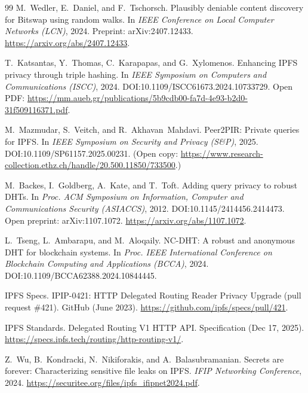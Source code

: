 \documentclass[11pt]{article}
\begin{document}
\begin{thebibliography}{99}
M.~Wedler, E.~Daniel, and F.~Tschorsch.
\newblock Plausibly deniable content discovery for Bitswap using random walks.
\newblock In \emph{IEEE Conference on Local Computer Networks (LCN)}, 2024.
\newblock Preprint: arXiv:2407.12433. \url{https://arxiv.org/abs/2407.12433}.

T.~Katsantas, Y.~Thomas, C.~Karapapas, and G.~Xylomenos.
\newblock Enhancing IPFS privacy through triple hashing.
\newblock In \emph{IEEE Symposium on Computers and Communications (ISCC)}, 2024.
\newblock DOI:10.1109/ISCC61673.2024.10733729.
\newblock Open PDF: \url{https://mm.aueb.gr/publications/5b9cdb00-fa7d-4e93-b2d0-31f509116371.pdf}.


M.~Mazmudar, S.~Veitch, and R.~Akhavan~Mahdavi.
\newblock Peer2PIR: Private queries for IPFS.
\newblock In \emph{IEEE Symposium on Security and Privacy (S\&P)}, 2025.
\newblock DOI:10.1109/SP61157.2025.00231.
\newblock (Open copy: \url{https://www.research-collection.ethz.ch/handle/20.500.11850/733500}.)

M.~Backes, I.~Goldberg, A.~Kate, and T.~Toft.
\newblock Adding query privacy to robust DHTs.
\newblock In \emph{Proc. ACM Symposium on Information, Computer and Communications Security (ASIACCS)}, 2012.
\newblock DOI:10.1145/2414456.2414473.
\newblock Open preprint: arXiv:1107.1072. \url{https://arxiv.org/abs/1107.1072}.


L.~Tseng, L.~Ambarapu, and M.~Aloqaily.
\newblock NC-DHT: A robust and anonymous DHT for blockchain systems.
\newblock In \emph{Proc. IEEE International Conference on Blockchain Computing and Applications (BCCA)}, 2024.
\newblock DOI:10.1109/BCCA62388.2024.10844445.


IPFS Specs.
\newblock IPIP-0421: HTTP Delegated Routing Reader Privacy Upgrade (pull request \#421).
\newblock GitHub (June 2023).
\newblock \url{https://github.com/ipfs/specs/pull/421}.

IPFS Standards.
\newblock Delegated Routing V1 HTTP API.
\newblock Specification (Dec 17, 2025).
\newblock \url{https://specs.ipfs.tech/routing/http-routing-v1/}.

Z.~Wu, B.~Kondracki, N.~Nikiforakis, and A.~Balasubramanian.
\newblock Secrets are forever: Characterizing sensitive file leaks on IPFS.
\newblock \emph{IFIP Networking Conference}, 2024.
\newblock \url{https://securitee.org/files/ipfs_ifipnet2024.pdf}.


\end{thebibliography}
\end{document}
